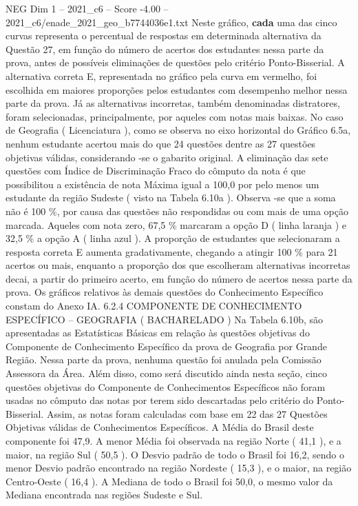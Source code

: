 \begin{textsample}{NEG Dim 1 – 2021\_c6 – Score -4.00 – 2021\_c6/enade\_2021\_geo\_b7744036e1.txt}
Neste gráfico, \textbf{cada} uma das cinco curvas representa o percentual de respostas em determinada alternativa da Questão 27, em função do número de acertos dos estudantes nessa parte da prova, antes de possíveis eliminações de questões pelo critério Ponto-Bisserial.
A alternativa correta E, representada no gráfico pela curva em vermelho, foi escolhida em maiores proporções pelos estudantes com desempenho melhor nessa parte da prova.
Já as alternativas incorretas, também denominadas distratores, foram selecionadas, principalmente, por aqueles com notas mais baixas.
No caso de Geografia ( Licenciatura ), como se observa no eixo horizontal do Gráfico 6.5a, nenhum estudante acertou mais do que 24 questões dentre as 27 questões objetivas válidas, considerando -se o gabarito original.
A eliminação das sete questões com Índice de Discriminação Fraco do cômputo da nota é que possibilitou a existência de nota Máxima igual a 100,0 por pelo menos um estudante da região Sudeste ( visto na Tabela 6.10a ).
Observa -se que a soma não é 100 \%, por causa das questões não respondidas ou com mais de uma opção marcada.
Aqueles com nota zero, 67,5 \% marcaram a opção D ( linha laranja ) e 32,5 \% a opção A ( linha azul ).
A proporção de estudantes que selecionaram a resposta correta E aumenta gradativamente, chegando a atingir 100 \% para 21 acertos ou mais, enquanto a proporção dos que escolheram alternativas incorretas decai, a partir do primeiro acerto, em função do número de acertos nessa parte da prova.
Os gráficos relativos às demais questões do Conhecimento Específico constam do Anexo IA. 6.2.4 COMPONENTE DE CONHECIMENTO ESPECÍFICO – GEOGRAFIA ( BACHARELADO ) Na Tabela 6.10b, são apresentadas as Estatísticas Básicas em relação às questões objetivas do Componente de Conhecimento Específico da prova de Geografia por Grande Região.
Nessa parte da prova, nenhuma questão foi anulada pela Comissão Assessora da Área.
Além disso, como será discutido ainda nesta seção, cinco questões objetivas do Componente de Conhecimentos Específicos não foram usadas no cômputo das notas por terem sido descartadas pelo critério do Ponto-Bisserial.
Assim, as notas foram calculadas com base em 22 das 27 Questões Objetivas válidas de Conhecimentos Específicos.
A Média do Brasil deste componente foi 47,9.
A menor Média foi observada na região Norte ( 41,1 ), e a maior, na região Sul ( 50,5 ).
O Desvio padrão de todo o Brasil foi 16,2, sendo o menor Desvio padrão encontrado na região Nordeste ( 15,3 ), e o maior, na região Centro-Oeste ( 16,4 ).
A Mediana de todo o Brasil foi 50,0, o mesmo valor da Mediana encontrada nas regiões Sudeste e Sul.

\end{textsample}
